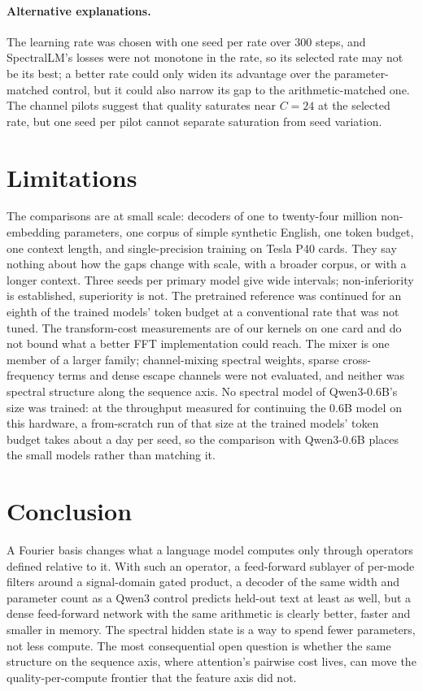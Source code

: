\paragraph{Alternative explanations.} The learning rate was chosen with one
seed per rate over 300 steps, and SpectralLM's losses were not monotone in the
rate, so its selected rate may not be its best; a better rate could only
widen its advantage over the parameter-matched control, but it could also
narrow its gap to the arithmetic-matched one. The channel pilots suggest that
quality saturates near $C=24$ at the selected rate, but one seed per pilot
cannot separate saturation from seed variation.

\section{Limitations}
\label{sec:limitations}

The comparisons are at small scale: decoders of one to twenty-four million
non-embedding parameters, one corpus of simple synthetic English, one token
budget, one context length, and single-precision training on Tesla P40
cards. They say nothing about how the gaps change with scale, with a broader
corpus, or with a longer context. Three seeds per primary model give wide
intervals; non-inferiority is established, superiority is not. The pretrained
reference was continued for an eighth of the trained models' token budget at a
conventional rate that was not tuned. The transform-cost measurements are of
our kernels on one card and do not bound what a better FFT implementation
could reach. The mixer is one member of a larger family; channel-mixing
spectral weights, sparse cross-frequency terms and dense escape channels were
not evaluated, and neither was spectral structure along the sequence axis.
No spectral model of Qwen3-0.6B's size was trained: at the throughput
measured for continuing the 0.6B model on this hardware, a from-scratch run of
that size at the trained models' token budget takes about a day per seed, so
the comparison with Qwen3-0.6B places the small models rather than matching
it.

\section{Conclusion}
\label{sec:conclusion}

A Fourier basis changes what a language model computes only through operators
defined relative to it. With such an operator, a feed-forward sublayer of
per-mode filters around a signal-domain gated product, a decoder of the same
width and parameter count as a Qwen3 control predicts held-out text at least
as well, but a dense feed-forward network with the same arithmetic is clearly
better, faster and smaller in memory. The spectral hidden state is a way to
spend fewer parameters, not less compute. The most consequential open
question is whether the same structure on the sequence axis, where attention's
pairwise cost lives, can move the quality-per-compute frontier that the
feature axis did not. \StatusConclusion
